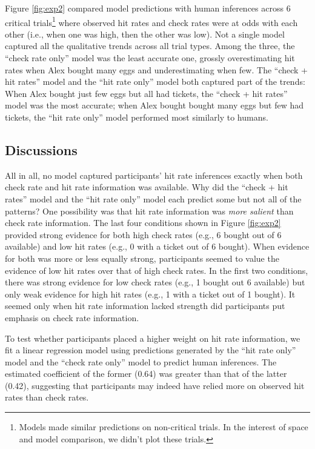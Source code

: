 \documentclass[10pt,letterpaper]{article}
\begin{document}
Figure \ref{fig:exp2} compared model predictions with human inferences across 6 critical trials\footnote{Models made similar predictions on non-critical trials. In the interest of space and model comparison, we didn't plot these trials.} where observed hit rates and check rates were at odds with each other (i.e., when one was high, then the other was low). Not a single model captured all the qualitative trends across all trial types. Among the three, the ``check rate only'' model was the least accurate one, grossly overestimating hit rates when Alex bought many eggs and underestimating when few. The ``check + hit rates'' model and the ``hit rate only'' model both captured part of the trends: When Alex bought just few eggs but all had tickets, the ``check + hit rates'' model was the most accurate; when Alex bought bought many eggs but few had tickets, the ``hit rate only'' model performed most similarly to humans.

\subsection{Discussions} 
All in all, no model captured participants' hit rate inferences exactly when both check rate and hit rate information was available. Why did the ``check + hit rates'' model and the ``hit rate only'' model each predict some but not all of the patterns? One possibility was that hit rate information was \emph{more salient} than check rate information. The last four conditions shown in Figure \ref{fig:exp2} provided strong evidence for both high check rates (e.g., 6 bought out of 6 available) and low hit rates (e.g., 0 with a ticket out of 6 bought). When evidence for both was more or less equally strong, participants seemed to value the evidence of low hit rates over that of high check rates. In the first two conditions, there was strong evidence for low check rates (e.g., 1 bought out 6 available) but only weak evidence for high hit rates (e.g., 1 with a ticket out of 1 bought). It seemed only when hit rate information lacked strength did participants put emphasis on check rate information. 

To test whether participants placed a higher weight on hit rate information, we fit a linear regression model using predictions generated by the ``hit rate only'' model and the ``check rate only'' model to predict human inferences. The estimated coefficient of the former (0.64) was greater than that of the latter (0.42), suggesting that participants may indeed have relied more on observed hit rates than check rates. 
\end{document}
